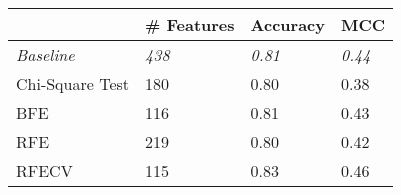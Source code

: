 \begin{tabular}{llll}
\toprule
        & \textbf{\# Features}   & \textbf{Accuracy} & \textbf{MCC}  \\
\midrule
\textit{Baseline}               & \textit{438}           & \textit{0.81}     & \textit{0.44} \\
Chi-Square Test                 & 180                    & 0.80              & 0.38          \\
BFE   & 116                    &  0.81            & 0.43          \\
RFE   & 219                    & 0.80            & 0.42          \\
RFECV & 115              & 0.83    & 0.46          \\
\bottomrule
\end{tabular}
